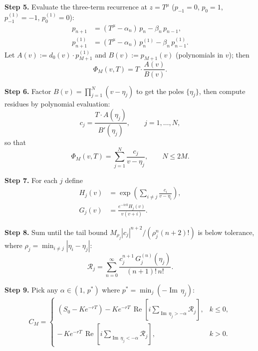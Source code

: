 \documentclass{article}
\newcommand{\Real}{\operatorname{Re}}
\newcommand{\Imag}{\operatorname{Im}}
\begin{document}
\bigskip
\noindent\textbf{Step 5.} Evaluate the three-term recurrence at $z=T^\mu$
($p_{-1}=0$, $p_0=1$, $p_{-1}^{(1)}=-1$, $p_0^{(1)}=0$):
\begin{align}
p_{n+1} &= (T^\mu-\alpha_n)\,p_n-\beta_n\,p_{n-1}, \\
p_{n+1}^{(1)} &= (T^\mu-\alpha_n)\,p_n^{(1)}-\beta_n\,p_{n-1}^{(1)}.
\end{align}
Let $A(v):=d_0(v)\cdot p_{M+1}^{(1)}$ and $B(v):=p_{M+1}(v)$
(polynomials in $v$); then
\begin{equation}
\Phi_M(v,T) = T\cdot\frac{A(v)}{B(v)}.
\end{equation}

\bigskip
\noindent\textbf{Step 6.} Factor $B(v)=\prod_{j=1}^N(v-\eta_j)$
to get the poles $\{\eta_j\}$, then compute residues by polynomial
evaluation:
\begin{equation}
c_j = \frac{T\cdot A(\eta_j)}{B'(\eta_j)},\qquad j=1,\ldots,N,
\end{equation}
so that
\begin{equation}
\Phi_M(v,T)=\sum_{j=1}^N\frac{c_j}{v-\eta_j},\qquad N\le2M.
\end{equation}

\bigskip
\noindent\textbf{Step 7.} For each $j$ define
\begin{align}
H_j(v) &= \exp\!\left(\sum_{i\ne j}\frac{c_i}{v-\eta_i}\right), \\
G_j(v) &= \frac{e^{-ivk}H_j(v)}{v(v+i)}.
\end{align}

\bigskip
\noindent\textbf{Step 8.} Sum until the tail bound
$M_{\rho_j}|c_j|^{n+2}/(\rho_j^n(n+2)!)$ is below tolerance,
where $\rho_j=\min_{i\ne j}|\eta_i-\eta_j|$:
\begin{equation}
\mathcal{R}_j = \sum_{n=0}^{\infty}
\frac{c_j^{n+1}\,G_j^{(n)}(\eta_j)}{(n+1)!\,n!}.
\end{equation}

\bigskip
\noindent\textbf{Step 9.} Pick any $\alpha\in(1,\,p^*)$ where
$p^*=\min_j(-\Imag\,\eta_j)$:
\begin{equation}
C_M=\begin{cases}
(S_0-Ke^{-rT})
-Ke^{-rT}\,\Real\!\left[i\displaystyle
\sum_{\Imag\,\eta_j>-\alpha}\!\!\mathcal{R}_j\right],
& k\le0,\\[1.8ex]
-\,Ke^{-rT}\,\Real\!\left[i\displaystyle
\sum_{\Imag\,\eta_j<-\alpha}\!\!\mathcal{R}_j\right],
& k>0.
\end{cases}
\end{equation}
\end{document}
